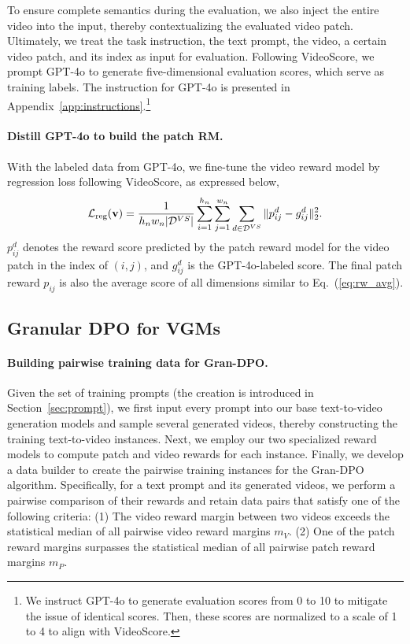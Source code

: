 To ensure complete semantics during the evaluation, we also inject the entire video into the input, thereby contextualizing the evaluated video patch. Ultimately, we treat the task instruction, the text prompt, the video, a certain video patch, and its index as input for evaluation. Following VideoScore, we prompt GPT-4o to generate five-dimensional evaluation scores, which serve as training labels. The instruction for GPT-4o is presented in Appendix~\ref{app:instructions}.\footnote{We instruct GPT-4o to generate evaluation scores from 0 to 10 to mitigate the issue of identical scores. Then, these scores are normalized to a scale of 1 to 4 to align with VideoScore.} 

\paragraph{Distill GPT-4o to build the patch RM.} With the labeled data from GPT-4o, we fine-tune the video reward model by regression loss following VideoScore, as expressed below,
\begin{equation}\small
    \mathcal{L}_{\text{reg}}(\mathbf{v}) =\frac{1}{h_nw_n|\mathcal{D}^{VS}|}\sum_{i=1}^{h_n}\sum_{j=1}^{w_n}\sum_{d\in\mathcal{D}^{VS}} \| p^{d}_{ij} - g^{d}_{ij} \|_2^2.
\end{equation}
$p^{d}_{ij}$ denotes the reward score predicted by the patch reward model for the video patch in the index of $(i,j)$, and $g^{d}_{ij}$ is the GPT-4o-labeled score. The final patch reward $p_{ij}$ is also the average score of all dimensions similar to Eq.~(\ref{eq:rw_avg}).

\subsection{Granular DPO for VGMs}\label{sec:dpo}

\paragraph{Building pairwise training data for Gran-DPO.} 
Given the set of training prompts (the creation is introduced in Section~\ref{sec:prompt}), we first input every prompt into our base text-to-video generation models and sample several generated videos, thereby constructing the training text-to-video instances. Next, we employ our two specialized reward models to compute patch and video rewards for each instance. Finally, we develop a data builder to create the pairwise training instances for the Gran-DPO algorithm. Specifically, for a text prompt and its generated videos, we perform a pairwise comparison of their rewards and retain data pairs that satisfy one of the following criteria: 
(1) The video reward margin between two videos exceeds the statistical median of all pairwise video reward margins $m_V$.
(2) One of the patch reward margins surpasses the statistical median of all pairwise patch reward margins $m_P$.

